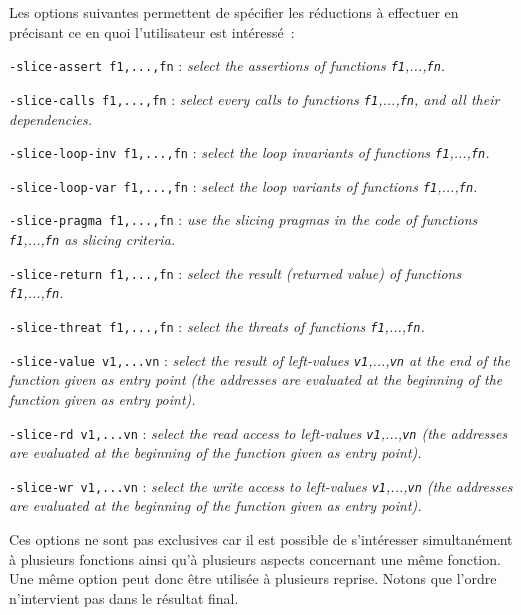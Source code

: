 Les options suivantes permettent de spécifier les réductions à
effectuer en précisant ce en quoi l'utilisateur est intéressé~:
\begin{description} 
\item {\tt -slice-assert f1,...,fn} :  
      {\sl select the assertions of functions {\tt f1},...,{\tt fn}.}

\item {\tt -slice-calls f1,...,fn} :  
      {\sl select every calls to functions {\tt f1},...,{\tt fn}, and all their dependencies.}

\item {\tt-slice-loop-inv f1,...,fn} : 
      {\sl select the loop invariants of functions {\tt f1},...,{\tt fn}.}
\item {\tt -slice-loop-var f1,...,fn} : 
      {\sl select the loop variants of functions {\tt f1},...,{\tt fn}.}
\item {\tt -slice-pragma f1,...,fn} :  
      {\sl use the slicing pragmas in the code of functions {\tt f1},...,{\tt fn} as slicing criteria.}

\item {\tt -slice-return f1,...,fn} :  
      {\sl select the result (returned value) of functions {\tt f1},...,{\tt fn}.}

\item {\tt -slice-threat f1,...,fn} :  
      {\sl select the threats of functions {\tt f1},...,{\tt fn}.}

\item {\tt -slice-value v1,...vn} :  
      {\sl select the result of left-values {\tt v1},...,{\tt vn}
        at the end of the function given as entry point
        (the addresses are evaluated at the beginning of the function given as entry point).}

\item {\tt -slice-rd v1,...vn} :  
      {\sl select the read access to left-values {\tt v1},...,{\tt vn}
        (the addresses are evaluated at the beginning of the function given as entry point).}

\item {\tt -slice-wr v1,...vn} :  
      {\sl select the write access to left-values {\tt v1},...,{\tt vn}
        (the addresses are evaluated at the beginning of the function given as entry point).}

\end{description}

Ces options ne sont pas exclusives 
car il est possible de s'intéresser simultanément 
à plusieurs fonctions 
ainsi qu'à plusieurs aspects concernant une même fonction.
Une même option peut donc être utilisée à plusieurs reprise.
Notons que l'ordre n'intervient pas dans le résultat final.

